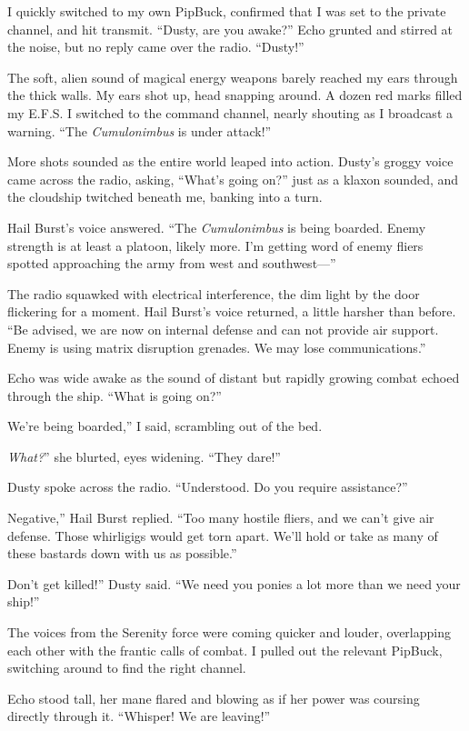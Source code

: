 I quickly switched to my own PipBuck, confirmed that I was set to the private channel, and hit transmit. “Dusty, are you awake?” Echo grunted and stirred at the noise, but no reply came over the radio. “Dusty!”

The soft, alien sound of magical energy weapons barely reached my ears through the thick walls. My ears shot up, head snapping around. A dozen red marks filled my E.F.S. I switched to the command channel, nearly shouting as I broadcast a warning. “The \textit{Cumulonimbus} is under attack!”

More shots sounded as the entire world leaped into action. Dusty’s groggy voice came across the radio, asking, “What’s going on?” just as a klaxon sounded, and the cloudship twitched beneath me, banking into a turn.

Hail Burst’s voice answered. “The \textit{Cumulonimbus} is being boarded. Enemy strength is at least a platoon, likely more. I’m getting word of enemy fliers spotted approaching the army from west and southwest—”

The radio squawked with electrical interference, the dim light by the door flickering for a moment. Hail Burst’s voice returned, a little harsher than before. “Be advised, we are now on internal defense and can not provide air support. Enemy is using matrix disruption grenades. We may lose communications.”

Echo was wide awake as the sound of distant but rapidly growing combat echoed through the ship. “What is going on?”

\leavevmode{}We’re being boarded,” I said, scrambling out of the bed.

\leavevmode{}\textit{What?}” she blurted, eyes widening. “They dare!”

Dusty spoke across the radio. “Understood. Do you require assistance?”

\leavevmode{}Negative,” Hail Burst replied. “Too many hostile fliers, and we can’t give air defense. Those whirligigs would get torn apart. We’ll hold or take as many of these bastards down with us as possible.”

\leavevmode{}Don’t get killed!” Dusty said. “We need you ponies a lot more than we need your ship!”

The voices from the Serenity force were coming quicker and louder, overlapping each other with the frantic calls of combat. I pulled out the relevant PipBuck, switching around to find the right channel.

Echo stood tall, her mane flared and blowing as if her power was coursing directly through it. “Whisper! We are leaving!”

